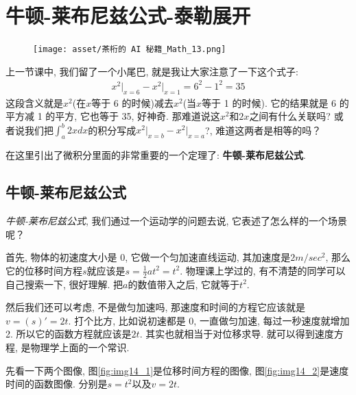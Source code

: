 \chapter{牛顿-莱布尼兹公式-泰勒展开}
\begin{figure}[ht]
  \centering
  \texttt{[image: asset/茶桁的 AI 秘籍\_Math\_13.png]}
\end{figure}
\newpage

上一节课中, 我们留了一个小尾巴, 就是我让大家注意了一下这个式子: 
\begin{align*}
  x^2\vert _{x=6}-x^2 \vert _{x=1}=6^2 - 1^2 = 35
\end{align*}
这段含义就是$x^2$(在$x$等于 6 的时候)减去$x^2$(当$x$等于 1 的时候). 它的结果就是 6 的平方减 1 的平方, 它也等于 35, 好神奇. 那难道说这$x^2$和$2x$之间有什么关联吗? 或者说我们把$\int_a^b2xdx$的积分写成$x^2\vert_{x=b}-x^2 \vert_{x=a}$?, 难道这两者是相等的吗？

在这里引出了微积分里面的非常重要的一个定理了: \textbf{牛顿-莱布尼兹公式}. 

\section{牛顿-莱布尼兹公式}

\textit{牛顿-莱布尼兹公式}, 我们通过一个运动学的问题去说, 它表述了怎么样的一个场景呢？

首先, 物体的初速度大小是 0, 它做一个匀加速直线运动, 其加速度是$2m/sec^2$, 那么它的位移时间方程$s$就应该是$s=\frac{1}{2}at^2 = t^2$. 物理课上学过的, 有不清楚的同学可以自己搜索一下, 很好理解. 把$a$的数值带入之后, 它就等于$t^2$. 

然后我们还可以考虑, 不是做匀加速吗, 那速度和时间的方程它应该就是$ v = (s)' = 2t$. 打个比方, 比如说初速都是 0, 一直做匀加速, 每过一秒速度就增加 2. 所以它的函数方程就应该是$2t$. 其实也就相当于对位移求导. 就可以得到速度方程, 是物理学上面的一个常识. 

先看一下两个图像, 图\ref{fig:img14_1}是位移时间方程的图像, 图\ref{fig:img14_2}是速度时间的函数图像. 分别是$s=t^2$以及$v=2t$. 

